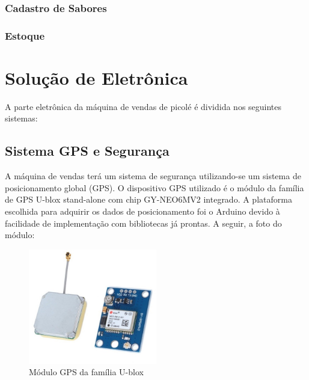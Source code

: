 \subsubsection{Cadastro de Sabores}


\subsubsection{Estoque}




\section{Solução de Eletrônica}

A parte eletrônica da máquina de vendas de picolé é dividida nos seguintes sistemas:

\subsection{Sistema GPS e Segurança}

A máquina de vendas terá um sistema de segurança utilizando-se um sistema de posicionamento global (GPS). O dispositivo GPS utilizado é o módulo da família de GPS U-blox stand-alone com chip GY-NEO6MV2 integrado. A plataforma escolhida para adquirir os dados de posicionamento foi o Arduino devido à facilidade de implementação com bibliotecas já prontas. A seguir, a foto do módulo:

\begin{figure}[H]
	\centering
    \includegraphics[width=0.5\textwidth]{figuras/modulo_gps}
    \caption{Módulo GPS da família U-blox}
    \label{fig:GPS}
\end{figure}


